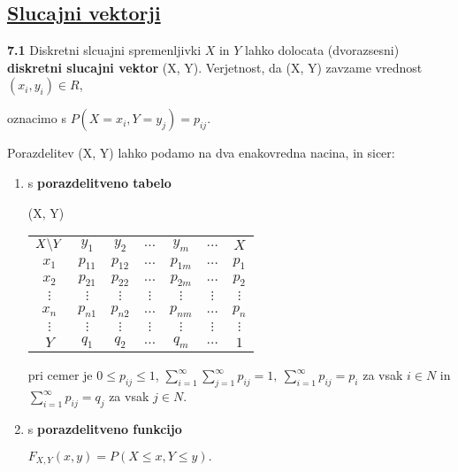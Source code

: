 \documentclass{article}
\begin{document}
\begin{multicols}{2}
\section{\underline{Slucajni vektorji}}

\textbf{7.1} Diskretni slcuajni spremenljivki $X$ in $Y$  lahko
dolocata (dvorazsesni) \textbf{diskretni slucajni vektor} (X, Y).
Verjetnost, da (X, Y) zavzame vrednost $(x_i, y_i) \in R$,

\begin{center}
    oznacimo s $P(X = x_i, Y = y_j) = p_{ij}$.
\end{center}

Porazdelitev (X, Y) lahko podamo na dva enakovredna nacina, in sicer:

\begin{enumerate}
    \item s \textbf{porazdelitveno tabelo}
        \begin{center}
            \begin{tiny}
                (X, Y)
                \begin{tabular}{ |c|c|c|c|c|c|c| } 
                    \hline
                        $ X \symbol{92} Y $ & $y_1$ & $y_2$ & $\dots$ & $y_m$ & $\dots$ & $X$ \\
                        \cline{1-7}
                        $x_1$ & $p_{11}$ & $p_{12}$ & $\dots$ & $p_{1m}$ & $\dots$ & $p_1$ \\
                        $x_2$ & $p_{21}$ & $p_{22}$ & $\dots$ & $p_{2m}$ & $\dots$ & $p_2$ \\
                        $\vdots$ & $\vdots$ & $\vdots$ & $\vdots$ & $\vdots $ & $\vdots$ & $\vdots$ \\
                        $x_n$ & $p_{n1}$ & $p_{n2}$ & $\dots$ & $p_{nm}$ & $\dots$ & $p_n$ \\
                        $\vdots$ & $\vdots$ & $\vdots$ & $\vdots$ & $\vdots $ & $\vdots$ & $\vdots$ \\
                        \cline{1-7}
                        $ Y $ & $q_1$ & $q_2$ & $\dots$ & $q_m$ & $\dots$ & $1$ \\
                    \hline
                    \end{tabular}
            \end{tiny}
        \end{center}
        pri cemer je $0 \leq p_{ij} \leq 1$,
        \begin{math}
            \sum_{i = 1}^{\infty} \sum_{j = 1}^{\infty} p_{ij} = 1,\:
            \sum_{i = 1}^{\infty} p_{ij} = p_i
        \end{math} za vsak $i \in N$ in
        \begin{math}
            \sum_{i = 1}^{\infty} p_{ij} = q_j
        \end{math} za vsak $j \in N$.
    \item s \textbf{porazdelitveno funkcijo}
        \begin{center}
            \begin{math}
                F_{X,Y}(x, y) = P(X \leq x, Y \leq y).
            \end{math}
            

\end{center}
\end{enumerate}
\end{multicols}
\end{document}

